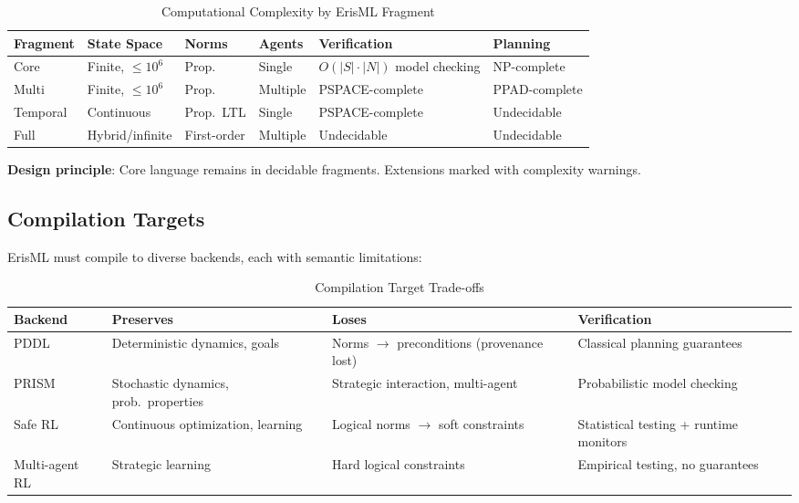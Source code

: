 \documentclass[conference]{IEEEtran}
\begin{document}
\begin{table}[t]
\caption{Computational Complexity by ErisML Fragment}
\label{tab:complexity}
\centering
\footnotesize
\begin{tabular}{@{}p{1.2cm}p{1.3cm}p{0.8cm}p{0.6cm}p{1.5cm}p{1.2cm}@{}}
\toprule
Fragment & State Space & Norms & Agents & Verification & Planning \\
\midrule
Core & Finite, $\leq 10^6$ & Prop. & Single & $O(|S|\cdot|N|)$ model checking & NP-complete \\
Multi & Finite, $\leq 10^6$ & Prop. & Multiple & PSPACE-complete & PPAD-complete \\
Temporal & Continuous & Prop.\ LTL & Single & PSPACE-complete & Undecidable \\
Full & Hybrid/infinite & First-order & Multiple & Undecidable & Undecidable \\
\bottomrule
\end{tabular}
\end{table}

\textbf{Design principle}: Core language remains in decidable fragments.
Extensions marked with complexity warnings.

\subsection{Compilation Targets}

ErisML must compile to diverse backends, each with semantic limitations:

\begin{table}[t]
\caption{Compilation Target Trade-offs}
\label{tab:backends}
\centering
\footnotesize
\begin{tabular}{@{}p{1.2cm}p{1.6cm}p{1.4cm}p{2.4cm}@{}}
\toprule
Backend & Preserves & Loses & Verification \\
\midrule
PDDL & Deterministic dynamics, goals & Norms $\to$ preconditions (provenance lost) & Classical planning guarantees \\
PRISM & Stochastic dynamics, prob.\ properties & Strategic interaction, multi-agent & Probabilistic model checking \\
Safe RL & Continuous optimization, learning & Logical norms $\to$ soft constraints & Statistical testing + runtime monitors \\
Multi-agent RL & Strategic learning & Hard logical constraints & Empirical testing, no guarantees \\
\bottomrule
\end{tabular}
\end{table}
\end{document}
